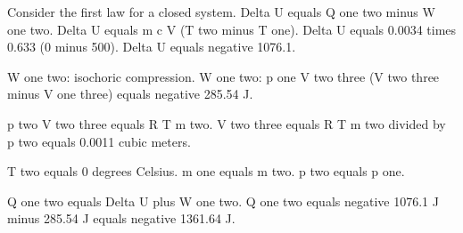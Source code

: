 Consider the first law for a closed system.  
Delta U equals Q one two minus W one two.  
Delta U equals m c V (T two minus T one).  
Delta U equals 0.0034 times 0.633 (0 minus 500).  
Delta U equals negative 1076.1.  

W one two: isochoric compression.  
W one two: p one V two three (V two three minus V one three) equals negative 285.54 J.  

p two V two three equals R T m two.  
V two three equals R T m two divided by p two equals 0.0011 cubic meters.  

T two equals 0 degrees Celsius.  
m one equals m two.  
p two equals p one.  

Q one two equals Delta U plus W one two.  
Q one two equals negative 1076.1 J minus 285.54 J equals negative 1361.64 J.